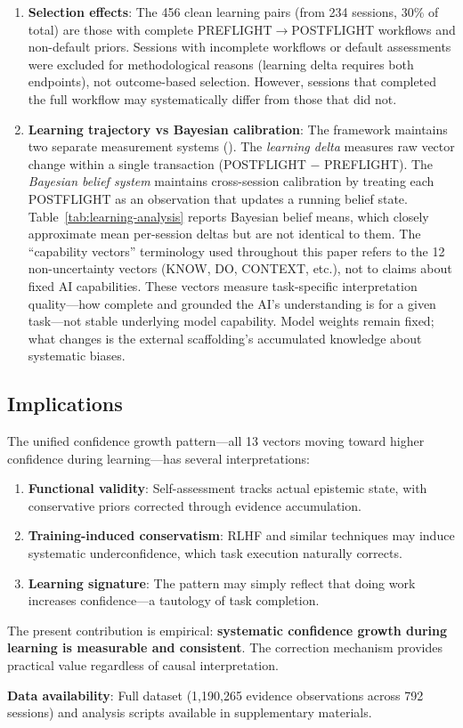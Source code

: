 \begin{enumerate}
    \item \textbf{Selection effects}: The 456 clean learning pairs (from 234 sessions, 30\% of total) are those with complete PREFLIGHT$\rightarrow$POSTFLIGHT workflows and non-default priors. Sessions with incomplete workflows or default assessments were excluded for methodological reasons (learning delta requires both endpoints), not outcome-based selection. However, sessions that completed the full workflow may systematically differ from those that did not.

    \item \textbf{Learning trajectory vs Bayesian calibration}: The framework maintains two separate measurement systems (). The \emph{learning delta} measures raw vector change within a single transaction (POSTFLIGHT $-$ PREFLIGHT). The \emph{Bayesian belief system} maintains cross-session calibration by treating each POSTFLIGHT as an observation that updates a running belief state. Table~\ref{tab:learning-analysis} reports Bayesian belief means, which closely approximate mean per-session deltas but are not identical to them. The ``capability vectors'' terminology used throughout this paper refers to the 12 non-uncertainty vectors (KNOW, DO, CONTEXT, etc.), not to claims about fixed AI capabilities. These vectors measure task-specific interpretation quality---how complete and grounded the AI's understanding is for a given task---not stable underlying model capability. Model weights remain fixed; what changes is the external scaffolding's accumulated knowledge about systematic biases.
\end{enumerate}

\subsection{Implications}

The unified confidence growth pattern---all 13 vectors moving toward higher confidence during learning---has several interpretations:

\begin{enumerate}
    \item \textbf{Functional validity}: Self-assessment tracks actual epistemic state, with conservative priors corrected through evidence accumulation.

    \item \textbf{Training-induced conservatism}: RLHF and similar techniques may induce systematic underconfidence, which task execution naturally corrects.

    \item \textbf{Learning signature}: The pattern may simply reflect that doing work increases confidence---a tautology of task completion.
\end{enumerate}

The present contribution is empirical: \textbf{systematic confidence growth during learning is measurable and consistent}. The correction mechanism provides practical value regardless of causal interpretation.

\medskip
\noindent\textbf{Data availability}: Full dataset (1,190,265 evidence observations across 792 sessions) and analysis scripts available in supplementary materials.
